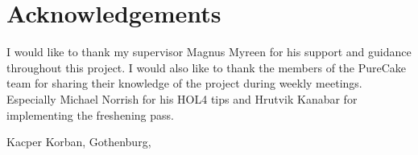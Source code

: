 \thispagestyle{plain}			%
\section*{Acknowledgements}
I would like to thank my supervisor Magnus Myreen for his support and guidance throughout this project. I would also like to thank the members of the PureCake team for sharing their knowledge of the project during weekly meetings. Especially Michael Norrish for his HOL4 tips and Hrutvik Kanabar for implementing the freshening pass.

\vspace{1.5cm}
\hfill
Kacper Korban, Gothenburg, \monthname \space \the\year

\newpage				%
\thispagestyle{empty}
\mbox{}
